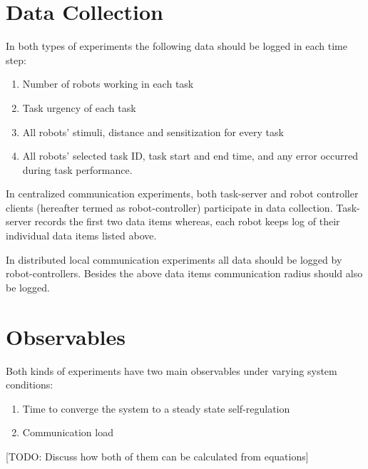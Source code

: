 \documentclass[11pt,a4paper]{report}
\begin{document}
\section{Data Collection}
In both types of experiments the following data should be logged in each time step:
\begin{enumerate}
\item Number of robots working in each task
\item Task urgency of each task 
\item All robots' stimuli, distance and sensitization for every task
\item All robots'  selected task ID, task start and end time, and any error occurred during task performance.
\end{enumerate}

In centralized communication experiments, both task-server and robot controller clients (hereafter termed as robot-controller) participate in data collection.  Task-server records the first two data items whereas, each robot keeps log of their individual  data items listed above.
 
In distributed local communication experiments all data should be logged by  robot-controllers. Besides the above data items communication radius should also be logged.

\section{Observables}
Both kinds of experiments have two main observables under varying system conditions:
\begin{enumerate}
\item Time to converge the system to a steady state self-regulation
\item Communication load 
\end{enumerate}
[TODO: Discuss how both of them can be calculated from equations]
\end{document}
